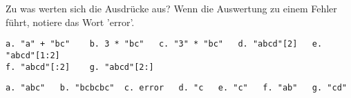 \question[7]
Zu was werten sich die Ausdrücke aus? Wenn die Auswertung zu einem Fehler führt, notiere das
Wort 'error'.

\begin{lstlisting}
a. "a" + "bc"    b. 3 * "bc"   c. "3" * "bc"   d. "abcd"[2]   e. "abcd"[1:2]
f. "abcd"[:2]    g. "abcd"[2:]
\end{lstlisting}
\begin{solutionbox}{2cm}
\begin{lstlisting}
a. "abc"   b. "bcbcbc"  c. error   d. "c   e. "c"   f. "ab"   g. "cd"
\end{lstlisting}
\end{solutionbox}
